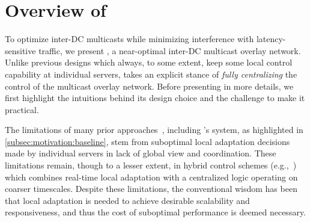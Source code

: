 \section{Overview of \name}
\label{sec:overview}

To optimize inter-DC multicasts while minimizing
interference with latency-sensitive traffic, we present {\em \name},
a near-optimal inter-DC multicast overlay network.
Unlike previous designs which always, to some extent, keep
some local control capability at individual servers,
\name takes an explicit stance of {\em fully centralizing} the
control of the multicast overlay network.
Before presenting \name in more details,
we first highlight the intuitions behind its design
choice and the challenge to make it practical.







The limitations of many prior approaches~\cite{Andreev2013Designing,Repantis2010Scaling,Huang2014A}, including \company's
system, as highlighted in \Section\ref{subsec:motivation:baseline},
stem from suboptimal local adaptation decisions made by individual servers
in lack of global view and coordination.
These limitations remain, though to a lesser extent, in hybrid
control schemes (e.g.,~\cite{yin2009design,mukerjee2014enabling})
which combines real-time local adaptation with a centralized logic
operating on coarser timescales.
Despite these limitations, the
conventional wisdom has
been that local adaptation is needed to achieve desirable
scalability and responsiveness, and thus the cost of suboptimal
performance is deemed necessary.

